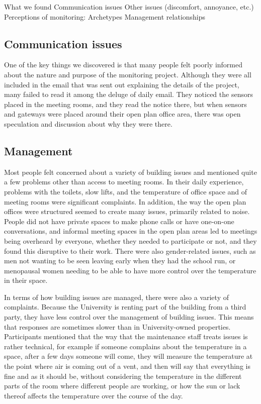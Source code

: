 What we found
Communication issues
Other issues (discomfort, annoyance, etc.)
Perceptions of monitoring: Archetypes
Management relationships

\subsection{Communication issues}
\label{sec:communication}

One of the key things we discovered is that many people felt poorly informed about the nature and purpose of the monitoring project. Although they were all included in the email that was sent out explaining the details of the project, many failed to read it among the deluge of daily email. They noticed the sensors placed in the meeting rooms, and they read the notice there, but when sensors and gateways were placed around their open plan office area, there was open speculation and discussion about why they were there.

\subsection{Management}
\label{sec:management}

Most people felt concerned about a variety of building issues and mentioned quite a few problems other than access to meeting rooms. In their daily experience, problems with the toilets, slow lifts, and the temperature of office space and of meeting rooms were significant complaints. In addition, the way the open plan offices were structured seemed to create many issues, primarily related to noise. People did not have private spaces to make phone calls or have one-on-one conversations, and informal meeting spaces in the open plan areas led to meetings being overheard by everyone, whether they needed to participate or not, and they found this disruptive to their work. There were also gender-related issues, such as men not wanting to be seen leaving early when they had the school run, or menopausal women needing to be able to have more control over the temperature in their space. 

In terms of how building issues are managed, there were also a variety of complaints. Because the University is renting part of the building from a third party, they have less control over the management of building issues. This means that responses are sometimes slower than in University-owned properties. Participants mentioned that the way that the maintenance staff treats issues is rather technical, for example if someone complains about the temperature in a space, after a few days someone will come, they will measure the temperature at the point where air is coming out of a vent, and then will say that everything is fine and as it should be, without considering the temperature in the different parts of the room where different people are working, or how the sun or lack thereof affects the temperature over the course of the day.

